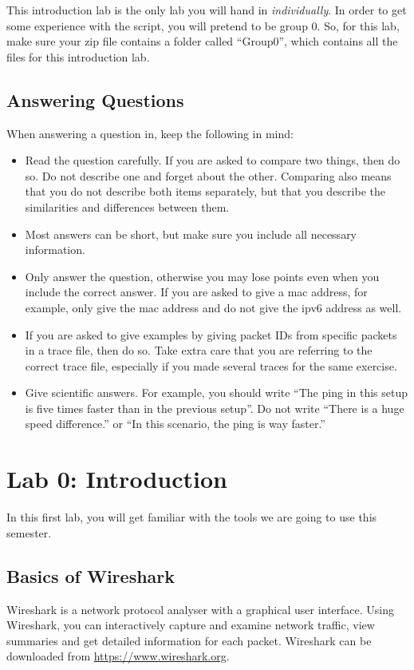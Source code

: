 \remark This introduction lab is the only lab you will hand in \emph{individually}. In order to get some experience with the script, you will pretend to be group 0. So, for this lab, make sure your zip file contains a folder called ``Group0'', which contains all the files for this introduction lab.

\subsection*{Answering Questions}
When answering a question in, keep the following in mind:
\begin{itemize}
	\item Read the question carefully. If you are asked to compare two things, then do so. Do not describe one and forget about the other. Comparing also means that you do not describe both items separately, but that you describe the similarities and differences between them.
	\item Most answers can be short, but make sure you include all necessary information.
	\item Only answer the question, otherwise you may lose points even when you include the correct answer. If you are asked to give a \ac{mac} address, for example, only give the \ac{mac} address and do not give the \ac{ipv6} address as well.
	\item If you are asked to give examples by giving packet IDs from specific packets in a trace file, then do so. Take extra care that you are referring to the correct trace file, especially if you made several traces for the same exercise.
	\item Give scientific answers. For example, you should write ``The ping in this setup is five times faster than in the previous setup''. Do not write ``There is a huge speed difference.'' or ``In this scenario, the ping is way faster.''
\end{itemize}

\newpage
\section{Lab 0: Introduction}\label{sec:lab0}
In this first lab, you will get familiar with the tools we are going to use this semester.

\subsection{Basics of Wireshark}
Wireshark is a network protocol analyser with a graphical user interface. Using Wireshark, you can interactively capture and examine network traffic, view summaries and get detailed information for each packet. Wireshark can be downloaded from \url{https://www.wireshark.org}.

